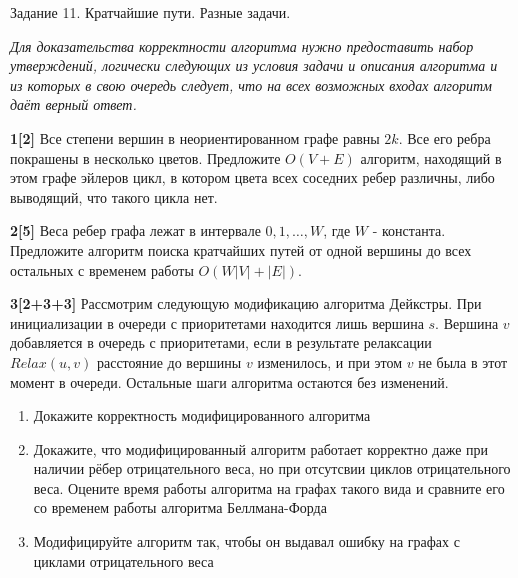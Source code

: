 \documentclass{article}
\begin{document}
\begin{center}
\Large {Задание 11. Кратчайшие пути. Разные задачи.}
\end{center}

\bigskip

\textit{Для доказательства корректности алгоритма нужно предоставить набор утверждений, логически следующих из условия задачи и описания алгоритма и из которых в свою очередь следует, что на всех возможных входах алгоритм даёт верный ответ.}

\medskip

\textbf{1[2]} Все степени вершин в неориентированном графе равны $2k$. Все его ребра покрашены в несколько цветов. Предложите $O(V + E)$ алгоритм, находящий в этом графе эйлеров цикл, в котором цвета всех соседних ребер различны, либо выводящий, что такого цикла нет.

\medskip

\textbf{2[5]} Веса ребер графа лежат в интервале $0, 1, \dots, W$, где $W$ - константа. Предложите алгоритм поиска кратчайших путей от одной вершины до всех остальных с временем работы $O(W|V| + |E|)$.

\medskip

\textbf{3[2+3+3]} Рассмотрим следующую модификацию алгоритма Дейкстры. При инициализации в очереди с приоритетами находится лишь вершина $s$. Вершина $v$ добавляется в очередь с приоритетами, если в результате релаксации $Relax(u, v)$ расстояние до вершины $v$ изменилось, и при этом $v$ не была в этот момент в очереди. Остальные шаги алгоритма остаются без изменений.

\begin{enumerate}
    \item Докажите корректность модифицированного алгоритма
    \item Докажите, что модифицированный алгоритм работает корректно даже при наличии рёбер отрицательного веса, но при отсутсвии циклов отрицательного веса. Оцените время работы алгоритма на графах такого вида и сравните его со временем работы алгоритма Беллмана-Форда
    \item Модифицируйте алгоритм так, чтобы он выдавал ошибку на графах с циклами отрицательного веса
\end{enumerate}












\end{document}
